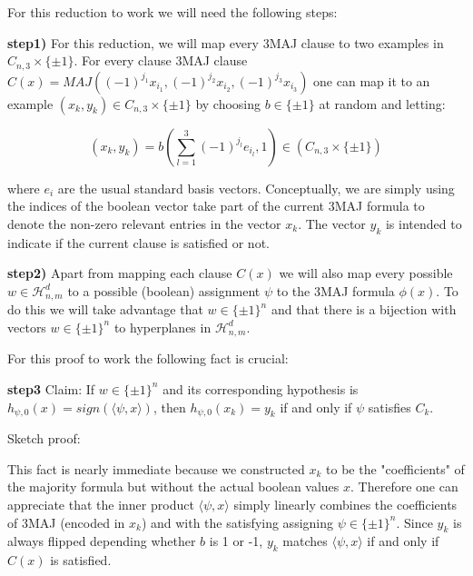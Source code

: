 \documentclass[12pt]{report}
\begin{document}
For this reduction to work we will need the following steps:

\textbf{step1)} For this reduction, we will map every 3MAJ clause to two examples in $C_{n,3} \times \{ \pm 1 \}$. For every clause 3MAJ clause $ C(x) = MAJ( (-1)^{j_1}x_{i_1} , (-1)^{j_2}x_{i_2} , (-1)^{j_3}x_{i_3} )$ one can map it to an example $(x_k , y_k) \in C_{n , 3} \times \{ \pm 1\}$ by choosing $b \in \{ \pm 1\}$ at random and letting:

$$(x_k, y_k) = b (\sum^3_{l=1} (-1)^{j_l} e_{i_l}, 1) \in (C_{n,3} \times \{ \pm 1 \})$$

where $e_i$ are the usual standard basis vectors.
Conceptually, we are simply using the indices of the boolean vector take part of the current 3MAJ formula to denote the non-zero relevant entries in the vector $x_k$.
The vector $y_k$ is intended to indicate if the current clause is satisfied or not.

\textbf{step2)} Apart from mapping each clause $C(x)$ we will also map every possible $w \in\mathcal{H}^d_{n,m}$ to a possible (boolean) assignment $\psi $ to the 3MAJ formula $\phi(x)$. 
To do this we will take advantage that $w \in \{ \pm 1 \}^n $ and that there is a bijection with vectors $w \in \{ \pm 1 \}^n $ to hyperplanes in $\mathcal{H}^d_{n,m}$.

For this proof to work the following fact is crucial:

\textbf{step3} Claim: If $w \in \{ \pm 1 \}^n $ and its corresponding hypothesis is $h_{\psi, 0} (x) = sign ( \langle \psi , x \rangle )$, then $h_{\psi, 0} (x_k) = y_k$ if and only if $\psi$ satisfies $C_k$. 

Sketch proof: 

This fact is nearly immediate because we constructed $x_k$ to be the "coefficients" of the majority formula but without the actual boolean values $x$. Therefore one can appreciate that the inner product  $ \langle \psi , x \rangle $ simply linearly combines the coefficients of 3MAJ (encoded in $x_k$) and with the satisfying assigning $\psi \in \{ \pm 1\}^n$. Since $y_k$ is always flipped depending whether $b$ is 1 or -1, $y_k$ matches $\langle \psi , x \rangle $ if and only if $C(x)$ is satisfied.  
\end{document}
